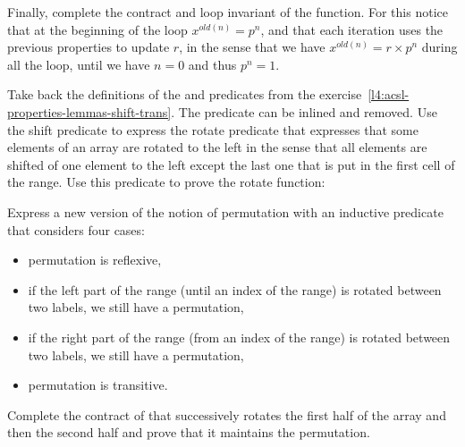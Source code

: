 Finally, complete the contract and loop invariant of the 
function. For this notice that at the beginning of the loop $x^{old(n)} = p^n$,
and that each iteration uses the previous properties to update $r$, in the sense
that we have $x^{old(n)} = r \times p^n$ during all the loop, until we have $n = 0$ and
thus $p^n = 1$.




Take back the definitions of the  and 
predicates from the exercise~\ref{l4:acsl-properties-lemmas-shift-trans}. The
 predicate can be inlined and removed. Use the
shift predicate to express the rotate predicate that expresses that some elements
of an array are rotated to the left in the sense that all elements are shifted of
one element to the left except the last one that is put in the first cell of the
range. Use this predicate to prove the rotate function:




Express a new version of the notion of permutation with an inductive predicate
that considers four cases:

\begin{itemize}
\item permutation is reflexive,
\item if the left part of the range (until an index of the range) is rotated
  between two labels, we still have a permutation,
\item if the right part of the range (from an index of the range) is rotated
  between two labels, we still have a permutation,
\item permutation is transitive.
\end{itemize}




Complete the contract of  that successively rotates the
first half of the array and then the second half and prove that it maintains the
permutation.


